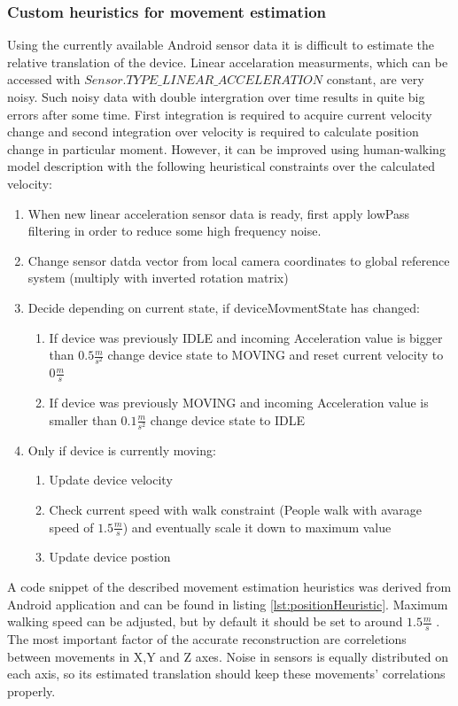 \subsubsection{Custom heuristics for movement estimation}
Using the currently available Android sensor data it is difficult to estimate the relative translation of the device. Linear accelaration measurments, which can be accessed with $Sensor.TYPE\_LINEAR\_ACCELERATION$ constant, are very noisy. Such noisy data with double intergration over time results in quite big errors after some time. First integration is required to acquire current velocity change and second integration over velocity is required to calculate position change in particular moment.
However, it can be improved using human-walking model description with the following heuristical constraints over the calculated velocity:
\begin{enumerate}
\item When new linear acceleration sensor data is ready, first apply lowPass filtering in order to reduce some high frequency noise.
\item Change sensor datda vector from local camera coordinates to global reference system (multiply with inverted rotation matrix)
\item Decide depending on current state, if deviceMovmentState has changed:
\begin{enumerate}
\item If device was previously IDLE and incoming Acceleration value is bigger than $0.5\frac{m}{s^2}$ change device state to MOVING and reset current velocity to $0\frac{m}{s}$
\item If device was previously MOVING and incoming Acceleration value is smaller than $0.1\frac{m}{s^2}$ change device state to IDLE
\end{enumerate}
\item Only if device is currently moving:
\begin{enumerate}
\item Update device velocity
\item Check current speed with walk constraint (People walk with avarage speed of $1.5\frac{m}{s}$) and eventually scale it down to maximum value
\item Update device postion
\end{enumerate}
\end{enumerate}
A code snippet of the described movement estimation heuristics was derived from Android application and can be found in  listing \ref{lst:positionHeuristic}. Maximum walking speed can be adjusted, but by default it should be set to around $1.5\frac{m}{s}$ \cite{website:walkingSpeed}. 
The most important factor of the accurate reconstruction are correletions between movements in X,Y and Z axes. Noise in sensors is equally distributed on each axis, so its estimated translation should keep these movements' correlations properly.

